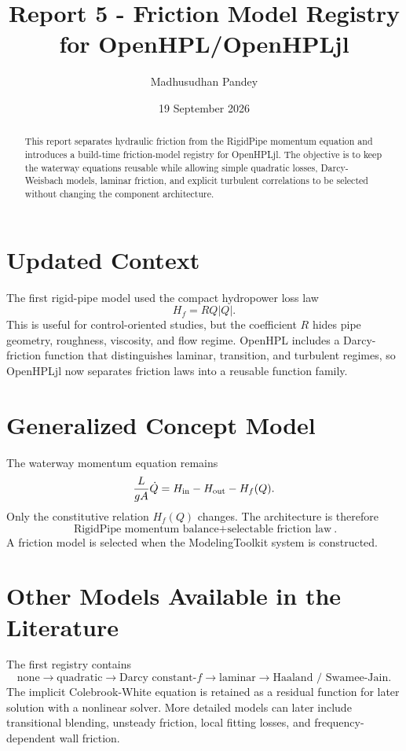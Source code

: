 \documentclass[11pt,a4paper]{article}
\title{Report 5 - Friction Model Registry for OpenHPL/OpenHPLjl}
\author{Madhusudhan Pandey}
\date{19 September 2026}
\begin{document}
\maketitle
\begin{abstract}
This report separates hydraulic friction from the RigidPipe momentum equation and introduces a build-time friction-model registry for OpenHPLjl. The objective is to keep the waterway equations reusable while allowing simple quadratic losses, Darcy-Weisbach models, laminar friction, and explicit turbulent correlations to be selected without changing the component architecture.
\end{abstract}

\section{Updated Context}
The first rigid-pipe model used the compact hydropower loss law
\[
H_f=RQ|Q|.
\]
This is useful for control-oriented studies, but the coefficient $R$ hides pipe geometry, roughness, viscosity, and flow regime. OpenHPL includes a Darcy-friction function that distinguishes laminar, transition, and turbulent regimes, so OpenHPLjl now separates friction laws into a reusable function family.

\section{Generalized Concept Model}
The waterway momentum equation remains
\[
\frac{L}{gA}\dot Q=H_{\rm in}-H_{\rm out}-H_f(Q).
\]
Only the constitutive relation $H_f(Q)$ changes. The architecture is therefore
\[
\boxed{\text{RigidPipe momentum balance}+\text{selectable friction law}}.
\]
A friction model is selected when the ModelingToolkit system is constructed.

\section{Other Models Available in the Literature}
The first registry contains
\[
\boxed{\text{none}\rightarrow\text{quadratic}\rightarrow\text{Darcy constant-}f\rightarrow\text{laminar}\rightarrow\text{Haaland / Swamee-Jain}}.
\]
The implicit Colebrook-White equation is retained as a residual function for later solution with a nonlinear solver. More detailed models can later include transitional blending, unsteady friction, local fitting losses, and frequency-dependent wall friction.
\end{document}
